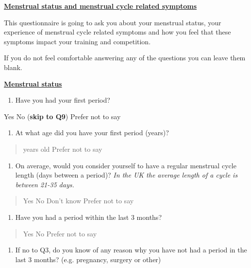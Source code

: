 \textbf{\underline{Menstrual status and menstrual cycle related symptoms}}

This questionnaire is going to ask you about your menstrual status,
your experience of menstrual cycle related symptoms and how you
feel that these symptoms impact your training and competition. 

If you do not feel comfortable answering any of the questions you can
leave them blank.

\textbf{\underline{Menstrual status}}

\begin{enumerate}
\def\labelenumi{\arabic{enumi})}
\item
  Have you had your first period?
\end{enumerate}

Yes No (\textbf{skip to Q9}) Prefer not to say

\begin{enumerate}
\def\labelenumi{\alph{enumi}.}
\item
  At what age did you have your first period (years)?
\end{enumerate}

\begin{quote}
years old Prefer not to say
\end{quote}

\begin{enumerate}
\def\labelenumi{\arabic{enumi})}
\setcounter{enumi}{1}
\item
  On average, would you consider yourself to have a regular menstrual
  cycle length (days between a period)? \emph{In the UK the average
  length of a cycle is between 21-35 days.}
\end{enumerate}

\begin{quote}
Yes No Don't know Prefer not to say
\end{quote}

\begin{enumerate}
\def\labelenumi{\arabic{enumi})}
\setcounter{enumi}{2}
\item
  Have you had a period within the last 3 months?
\end{enumerate}

\begin{quote}
Yes No Prefer not to say
\end{quote}

\begin{enumerate}
\def\labelenumi{\alph{enumi}.}
\item
  If no to Q3, do you know of any reason why you have not had a period
  in the last 3 months? (e.g. pregnancy, surgery or other)
\end{enumerate}


